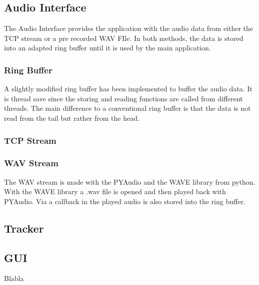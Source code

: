 \subsection{Audio Interface}
The Audio Interface provides the application with the audio data
from either the TCP stream or a pre recorded WAV FIle.
In both methods, the data is stored into an adapted ring buffer
until it is used by the main application.
\subsubsection{Ring Buffer}
A slightly modified ring buffer has been implemented to buffer the 
audio data.
It is thread save since the storing and reading functions are called from 
different threads.
The main difference to a conventional ring buffer is that the data is not 
read from the tail but rather from the head.


\subsubsection{TCP Stream}

\subsubsection{WAV Stream}
The WAV stream is made with the PYAudio and the WAVE library from python.
With the WAVE library a .wav file is opened and then 
played back with PYAudio.
Via a callback in the played audio is also stored into the ring buffer.

\subsection{Tracker}


\subsection{GUI}


Blabla

